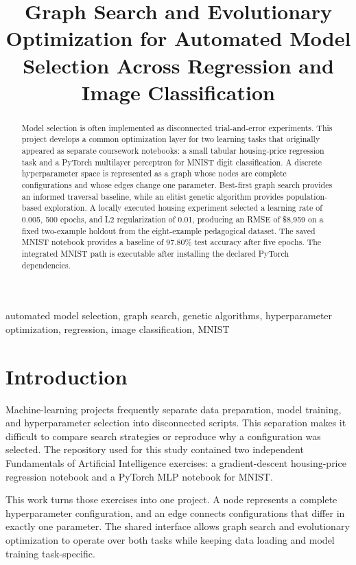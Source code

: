 \documentclass[conference]{IEEEtran}
\title{Graph Search and Evolutionary Optimization for Automated Model Selection Across Regression and Image Classification}
\author{\IEEEauthorblockN{Naga Sampath Maddineni} \IEEEauthorblockA{\textit{University of North Texas}\\ Denton, Texas, USA}}
\begin{document}
\maketitle

\begin{abstract}
Model selection is often implemented as disconnected trial-and-error experiments. This project develops a common optimization layer for two learning tasks that originally appeared as separate coursework notebooks: a small tabular housing-price regression task and a PyTorch multilayer perceptron for MNIST digit classification. A discrete hyperparameter space is represented as a graph whose nodes are complete configurations and whose edges change one parameter. Best-first graph search provides an informed traversal baseline, while an elitist genetic algorithm provides population-based exploration. A locally executed housing experiment selected a learning rate of 0.005, 500 epochs, and L2 regularization of 0.01, producing an RMSE of \$8,959 on a fixed two-example holdout from the eight-example pedagogical dataset. The saved MNIST notebook provides a baseline of 97.80\% test accuracy after five epochs. The integrated MNIST path is executable after installing the declared PyTorch dependencies.
\end{abstract}

\begin{IEEEkeywords}
automated model selection, graph search, genetic algorithms, hyperparameter optimization, regression, image classification, MNIST
\end{IEEEkeywords}

\section{Introduction}
Machine-learning projects frequently separate data preparation, model training, and hyperparameter selection into disconnected scripts. This separation makes it difficult to compare search strategies or reproduce why a configuration was selected. The repository used for this study contained two independent Fundamentals of Artificial Intelligence exercises: a gradient-descent housing-price regression notebook and a PyTorch MLP notebook for MNIST.

This work turns those exercises into one project. A node represents a complete hyperparameter configuration, and an edge connects configurations that differ in exactly one parameter. The shared interface allows graph search and evolutionary optimization to operate over both tasks while keeping data loading and model training task-specific.
\end{document}
